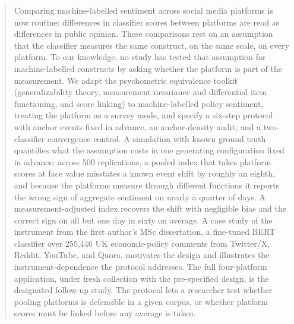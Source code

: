 
\begin{abstract}
Comparing machine-labelled sentiment across social media platforms is
now routine: differences in classifier scores between platforms are
read as differences in public opinion. These comparisons rest on an
assumption that the classifier measures the same construct, on the
same scale, on every platform. To our knowledge, no study has tested
that assumption for machine-labelled constructs by asking whether the
platform is part of the measurement. We adapt the psychometric
equivalence toolkit (generalizability theory, measurement invariance
and differential item functioning, and score linking) to
machine-labelled policy sentiment, treating the platform as a survey
mode, and specify a six-step protocol with anchor events fixed in advance, an anchor-density audit, and a two-classifier convergence
control. A simulation with known ground truth quantifies what the assumption costs in one generating configuration fixed in advance: across 500 replications, a pooled index that takes platform scores at face value misstates a known event shift by roughly an eighth, and because the platforms measure through different functions it reports the wrong sign of aggregate sentiment on nearly a quarter of days. A measurement-adjusted index recovers the shift with negligible bias and the correct sign on all but one day in sixty on average. A case study of the instrument from the first author's MSc dissertation, a fine-tuned BERT classifier over 255,446 UK
economic-policy comments from Twitter/X, Reddit, YouTube, and Quora,
motivates the design and illustrates the instrument-dependence the protocol addresses. The full four-platform application, under fresh collection with the pre-specified design, is the designated follow-up study. The protocol lets a researcher test whether pooling
platforms is defensible in a given corpus, or whether platform scores
must be linked before any average is taken.
\end{abstract}
